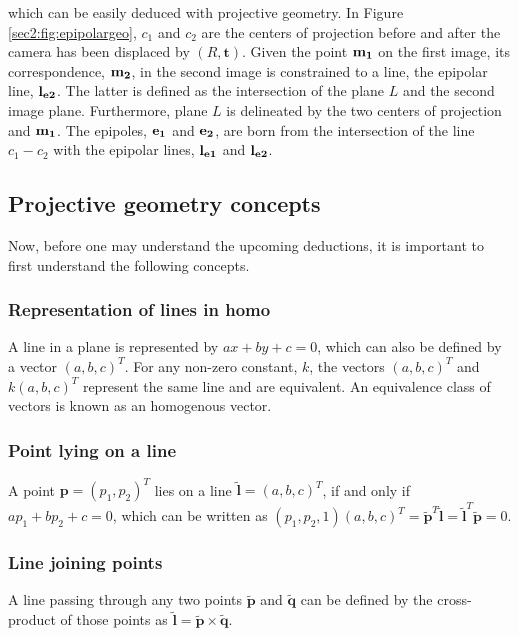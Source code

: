 which can be easily deduced with projective geometry. In Figure \ref{sec2:fig:epipolargeo}, $c_1$ and $c_2$ are the centers of projection before and after the camera has been displaced by $(R, \mathbf{t})$. Given the point $\bf m_1$ on the first image, its correspondence, $\bf m_2$, in the second image is constrained to a line, the epipolar line, $\bf l_{e2}$. The latter is defined as the intersection of the plane $L$ and the second image plane. Furthermore, plane $L$ is delineated by the two centers of projection and $\bf m_1$. The epipoles, $\bf e_1$ and $\bf e_2$, are born from the intersection of the line $c_1 - c_2$ with the epipolar lines, $\bf l_{e1}$ and $\bf l_{e2}$. 

\subsection{Projective geometry concepts}

Now, before one may understand the upcoming deductions, it is important to first understand the following concepts.
\subsubsection{Representation of lines in \gls{homo}}
A line in a plane is represented by $a x + b y + c = 0$, which can also be defined by a vector $( a , b , c ) ^T$. For any non-zero constant, $k$, the vectors  $( a , b , c ) ^T$ and $k(a , b , c ) ^T$ represent the same line and are equivalent. An equivalence class of vectors is known as an homogenous vector. 
\subsubsection{Point lying on a line}
A point $\mathbf { p } = ( p_1 , p_2 ) ^ T$ lies on a line $\mathbf {\tilde{l}} = ( a , b , c ) ^ { T }$, if and only if $a p_1 + b p_2 + c = 0$, which can be written as $( p_1 , p_2 , 1 ) ( a , b , c ) ^T = \mathbf { \tilde{p} } ^T \mathbf {\tilde{l}} = \mathbf {\tilde{l}} ^T \mathbf { \tilde{p} } = 0$.
\subsubsection{Line joining points}
A line passing through any two points $\mathbf{\tilde{p}}$ and $\mathbf{\tilde{q}}$ can be defined by the cross-product of those points as $\mathbf{\tilde{l}} = \mathbf{\tilde{p}} \times \mathbf{\tilde{q}}$.
